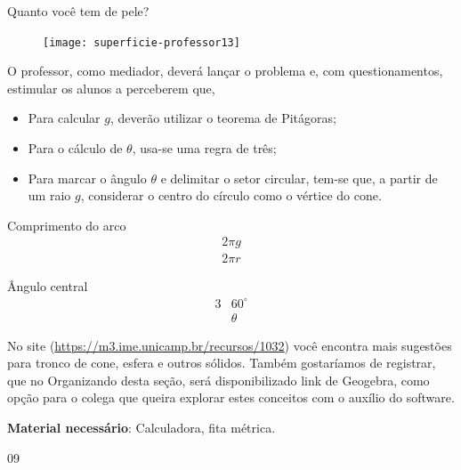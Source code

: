 \begin{sugestions}{Quanto você tem de pele?}
{\begin{enumerate}
\begin{figure}[H]
\texttt{[image: superficie-professor13]}
\end{figure}
\end{enumerate}

 
O professor, como mediador, deverá lançar o problema e, com questionamentos, estimular os alunos a perceberem que, 

\begin{itemize}
\item  Para calcular $g$, deverão utilizar o teorema de Pitágoras;
\item Para o cálculo de $\theta$, usa-se uma regra de três;
\item Para marcar o ângulo $\theta$ e delimitar o setor circular, tem-se que, a partir de um raio $g$, considerar o centro do círculo como o vértice do cone.
\end{itemize}

\begin{multicols}{2}
\centering
Comprimento do arco
\begin{align*}
2\pi g\\
2\pi r
\end{align*}

\columnbreak
Ângulo central
\begin{align*}
3&60^{\circ}\\
&\theta
\end{align*}
\end{multicols}
No site (\url{https://m3.ime.unicamp.br/recursos/1032}) você encontra mais sugestões para tronco de cone, esfera e outros sólidos. Também gostaríamos de registrar, que no Organizando desta seção, será disponibilizado link de Geogebra, como opção para o colega que queira explorar estes conceitos com o auxílio do software.

\textbf{Material necessário}: Calculadora, fita métrica.
}{0}{9}
\end{sugestions}
\clearmargin
\marginpar{\vspace{.5em}}
